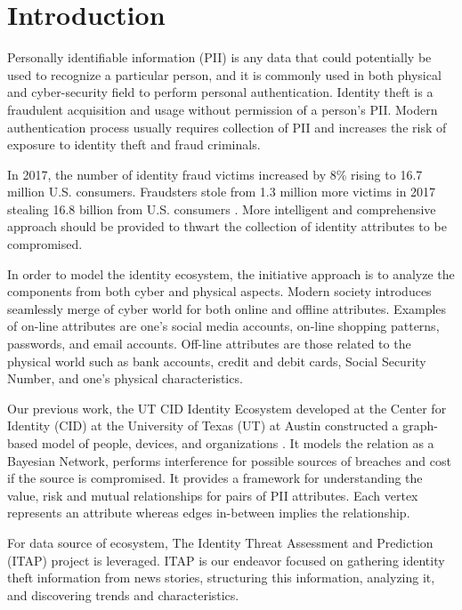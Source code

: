 \documentclass[conference]{IEEEtran}
\begin{document}
\section{Introduction}
 Personally identifiable information (PII) is any data that could potentially be used to recognize a particular person, and it is commonly used in both physical and cyber-security field to perform personal authentication. Identity theft is a fraudulent acquisition and usage without permission of a person's PII. Modern authentication process usually requires collection of PII and increases the risk of exposure to identity theft and fraud criminals.

In 2017, the number of identity fraud victims increased by 8\% rising to 16.7 million U.S. consumers. Fraudsters stole from 1.3 million more victims in 2017 stealing 16.8 billion from U.S. consumers \cite{Pascual}. More intelligent and comprehensive approach should be provided to thwart the collection of identity attributes to be compromised. 


In order to model the identity ecosystem, the initiative approach is to analyze the components from both cyber and physical aspects. Modern society introduces seamlessly merge of cyber world for both online and offline attributes. Examples of on-line attributes are one's social media accounts, on-line shopping patterns, passwords, and email accounts. Off-line attributes are those related to the physical world such as bank accounts, credit and debit cards, Social Security Number, and one's physical characteristics.

Our previous work, the UT CID Identity Ecosystem developed at the Center for Identity (CID) at the University of Texas (UT) at Austin constructed a graph-based model of people, devices,
and organizations \cite{EcosystemModeling}. It models the relation as a Bayesian Network, performs interference for possible sources of breaches and cost if the source is compromised.
It provides a framework for understanding the value, risk and mutual relationships for pairs of PII attributes. Each vertex represents an attribute whereas edges in-between implies the relationship.

For data source of ecosystem, The Identity Threat Assessment and Prediction (ITAP) \cite{ITAPDataSource} project is leveraged. ITAP is our endeavor focused on gathering identity theft information from news stories, structuring this information, analyzing it, and discovering trends and characteristics.
\end{document}
